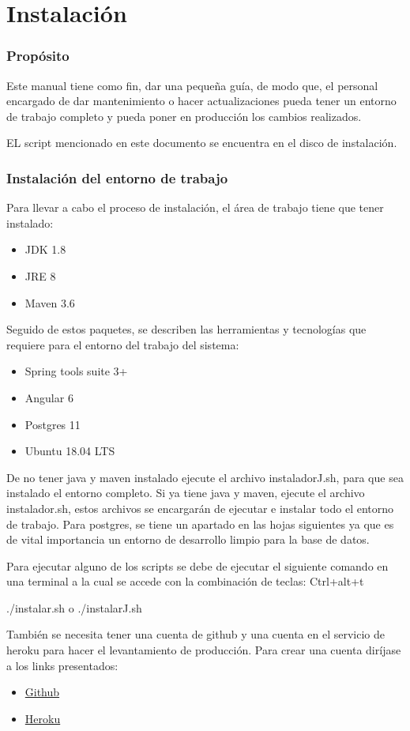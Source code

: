\chapter{Instalación}

\subsection{Propósito}
Este manual tiene como fin, dar una pequeña guía, de modo que, el personal encargado de dar mantenimiento o hacer actualizaciones pueda tener un entorno de trabajo completo y pueda poner en producción los cambios realizados.

EL script mencionado en este documento se encuentra en el disco de instalación. 

\subsection{Instalación del entorno de trabajo}
Para llevar a cabo el proceso de instalación, el área de trabajo tiene que tener instalado:
\begin{itemize}
  \item JDK 1.8
  \item JRE 8
  \item Maven 3.6
\end{itemize}

Seguido de estos paquetes, se describen las herramientas y tecnologías que requiere para el entorno del trabajo del sistema:
\begin{itemize}
  \item Spring tools suite 3+
  \item Angular 6
  \item Postgres 11
  \item Ubuntu 18.04 LTS
\end{itemize}
De no tener java y maven instalado ejecute el archivo instaladorJ.sh, para que sea instalado el entorno completo.
Si ya tiene java y maven, ejecute el archivo instalador.sh, estos archivos se encargarán de ejecutar e instalar todo el entorno de trabajo.
Para postgres, se tiene un apartado en las hojas siguientes ya que es de vital importancia un entorno de desarrollo limpio para la base de datos.

Para ejecutar alguno de los scripts se debe de ejecutar el siguiente comando en una terminal a la cual se accede con la combinación de teclas: Ctrl+alt+t

./instalar.sh 
o
./instalarJ.sh

También se necesita tener una cuenta de github y una cuenta en el servicio de heroku para hacer el levantamiento de producción. Para crear una cuenta diríjase a los links presentados:
\begin{itemize}
  \item \href{htt://codigofacilito.com/articulos/como-crear-una-cuenta-y-un-repo-en-github}{Github}
  \item \href{https://signup.heroku.com/dc}{Heroku}
\end{itemize}
